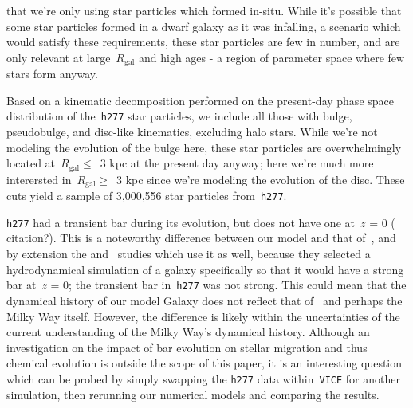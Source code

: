 \documentclass[fleqn, usenatbib]{mnras}
\begin{document}
that we're only using star particles which formed in-situ. While it's possible 
that some star particles formed in a dwarf galaxy as it was infalling, a 
scenario which would satisfy these requirements, these star particles are few 
in number, and are only relevant at large~$R_\text{gal}$ and high ages - a 
region of parameter space where few stars form anyway. 
\par 
Based on a kinematic decomposition performed on the present-day phase space 
distribution of the~\texttt{h277} star particles, we include all those with 
bulge, pseudobulge, and disc-like kinematics, excluding halo stars. While we're 
not modeling the evolution of the bulge here, these star particles are 
overwhelmingly located at~$R_\text{gal}\leq$~3 kpc at the present day anyway; 
here we're much more interersted in~$R_\text{gal}\geq$~3 kpc since we're 
modeling the evolution of the disc. These cuts yield a sample of 3,000,556 star 
particles from~\texttt{h277}. 
\par 
\texttt{h277} had a transient bar during its evolution, but does not have one 
at~$z$ = 0 ({\color{red} citation?}). This is a noteworthy difference between 
our model and that of~\citet{Minchev2013}, and by extension the 
\citet*{Minchev2014} and~\citet{Minchev2017} studies which use it as well, 
because they selected a hydrodynamical simulation of a galaxy specifically so 
that it would have a strong bar at~$z$ = 0; the transient bar in~\texttt{h277} 
was not strong. This could mean that the dynamical 
history of our model Galaxy does not reflect that of~\citet{Minchev2013} and 
perhaps the Milky Way itself. However, the difference is likely within the 
uncertainties of the current understanding of the Milky Way's dynamical 
history. Although an investigation on the impact of bar evolution on stellar 
migration and thus chemical evolution is outside the scope of this paper, it is 
an interesting question which can be probed by simply swapping the 
\texttt{h277} data within~\texttt{VICE} for another simulation, then rerunning 
our numerical models and comparing the results. 
\end{document}

